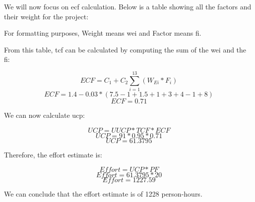 \documentclass[11pt]{article}
\begin{document}
\newpage

We will now focus on \gls{ecf} calculation. Below is a table showing all the factors and their weight for the project:

\begin{table}[ht!]
\centering
\caption{\gls{ecf} calculation}
\end{table}

For formatting purposes, Weight means \gls{wei} and Factor means \gls{fi}. \newline

From this table, \gls{tcf} can be calculated by computing the sum of the \gls{wei} and the \gls{fi}:

$$ ECF = C_{1} + C_{2}\sum\limits_{i=1}^{13} (W_{Ei} * F_{i}) $$
$$ ECF = 1.4 - 0.03 * (7.5 - 1 + 1.5 + 1 + 3 + 4 - 1 + 8) $$
$$ ECF = 0.71 $$

We can now calculate \gls{ucp}:

$$ UCP = UUCP * TCF * ECF $$
$$ UCP = 91 * 0.95 * 0.71 $$
$$ UCP = 61.3795 $$

Therefore, the effort estimate is:

$$ Effort = UCP * PF $$
$$ Effort = 61.3795 * 20 $$
$$ Effort = 1227.59 $$

We can conclude that the effort estimate is of 1228 person-hours.
\end{document}
